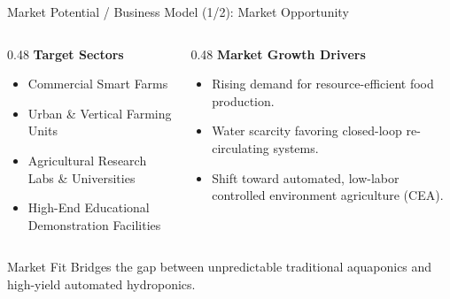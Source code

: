 \documentclass[aspectratio=169, 10pt]{beamer}
\begin{document}
\begin{frame}{Market Potential / Business Model (1/2): Market Opportunity}
  \begin{columns}[T]
    \begin{column}{0.48\textwidth}
      \textbf{Target Sectors}
      \begin{itemize}
        \item Commercial Smart Farms
        \item Urban \& Vertical Farming Units
        \item Agricultural Research Labs \& Universities
        \item High-End Educational Demonstration Facilities
      \end{itemize}
    \end{column}
    
    \begin{column}{0.48\textwidth}
      \textbf{Market Growth Drivers}
      \begin{itemize}
        \item Rising demand for resource-efficient food production.
        \item Water scarcity favoring closed-loop re-circulating systems.
        \item Shift toward automated, low-labor controlled environment agriculture (CEA).
      \end{itemize}
    \end{column}
  \end{columns}

  \vspace{0.4cm}
  \begin{block}{Market Fit}
    Bridges the gap between unpredictable traditional aquaponics and high-yield automated hydroponics.
  \end{block}
\end{frame}
\end{document}
